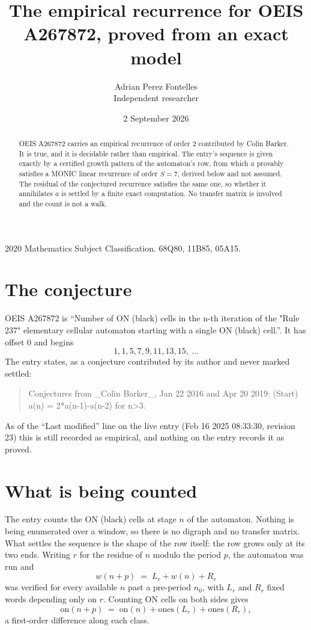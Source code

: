 \documentclass[11pt,a4paper]{article}
\title{The empirical recurrence for OEIS A267872, proved from an exact model}
\author{Adrian Perez Fontelles\\ \small Independent researcher}
\date{2 September 2026}
\theoremstyle{plain}
\theoremstyle{definition}
\begin{document}
\maketitle

\begin{abstract}
OEIS A267872 carries an empirical recurrence of order $2$ contributed by Colin Barker. It is true, and it is
decidable rather than empirical. The entry's sequence is given exactly by a certified growth pattern of the automaton's row, from
which $a$ provably satisfies a MONIC linear recurrence of order $S=7$, derived below and not
assumed. The residual of the conjectured recurrence satisfies the same one, so whether it
annihilates $a$ is settled by a finite exact computation. No transfer matrix is involved and
the count is not a walk.
\end{abstract}

\noindent\small 2020 Mathematics Subject Classification. 68Q80, 11B85, 05A15.\normalsize

\section{The conjecture}

OEIS A267872 is ``Number of ON (black) cells in the n-th iteration of the "Rule 237" elementary cellular automaton starting with a single ON (black) cell.''. It has offset $0$ and begins
\[
1, 1, 5, 7, 9, 11, 13, 15,\ \dots
\]
The entry states, as a conjecture contributed by its author and never marked settled:
\begin{quote}
Conjectures from \_Colin Barker\_, Jan 22 2016 and Apr 20 2019: (Start) a(n) = 2*a(n-1)-a(n-2) for n>3.
\end{quote}
As of the ``Last modified'' line on the live entry (Feb 16 2025 08:33:30, revision 23)
this is still recorded as empirical, and nothing on the entry records it as proved.

\section{What is being counted}

The entry counts the ON (black) cells at stage $n$ of the automaton. Nothing is being enumerated over a window, so there is
no digraph and no transfer matrix. What settles the sequence is the shape of the row itself:
the row grows only at its two ends. Writing
$r$ for the residue of $n$ modulo the period $p$, the automaton was run and
\[
w(n+p)\;=\;L_r + w(n) + R_r
\]
was verified for every available $n$ past a
pre-period $n_0$, with $L_r$ and $R_r$ fixed words depending only on $r$. Counting ON cells on
both sides gives
\[
\mathrm{on}(n+p)\;=\;\mathrm{on}(n)+\mathrm{ones}(L_r)+\mathrm{ones}(R_r),
\]
a first-order difference along each class.
\end{document}

